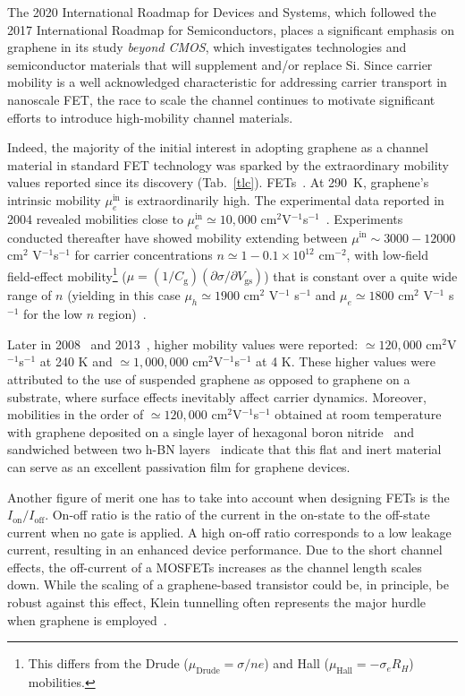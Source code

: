 The 2020 International Roadmap for Devices and Systems, which followed the 2017 International Roadmap for Semiconductors, places a significant emphasis on graphene in its study \textit{beyond CMOS}, which investigates technologies and semiconductor materials that will supplement and/or replace Si. Since carrier mobility is a well acknowledged characteristic for addressing carrier transport in nanoscale \gls{FET}, the race to scale the channel continues to motivate significant efforts to introduce high-mobility channel materials.

Indeed, the majority of the initial interest in adopting graphene as a channel material in standard FET technology was sparked by the extraordinary mobility values reported since its discovery (Tab.~\ref{tlc}). \glspl{FET}~\cite{schwierz2010nanometer}. At \SI{290}{\kelvin}, graphene's intrinsic mobility $\mu_e^{\textrm{in}}$ is extraordinarily high. The experimental data reported in 2004 revealed mobilities close to $\mu_e^\textrm{in}\simeq10,000$ cm$^{2}$V$^{-1}$s$^{-1}$~\cite{novoselov2004electric}.
Experiments conducted thereafter have showed mobility extending between $\mu^{\text{in}}\sim 3000 - 12000$ cm$^2$ V$^{-1}$s$^{-1}$ for carrier concentrations $n\simeq1 - 0.1 \times 10^{12}$ cm$^{-2}$, with
low-field field-effect mobility\footnote[2]{This differs from the Drude ($\mu_{\textrm{Drude}}=\sigma/ne$) and Hall ($\mu_\textrm{Hall}=-\sigma_e R_H$) mobilities.} ($\mu = (1/C_{\textrm{g}})(\partial \sigma/\partial V_{\textrm{gs}})$)
that is constant over a quite wide range of $n$ (yielding in this case $\mu_h\simeq1900$ cm$^2$ V$^{-1}$ s$^{-1}$ and $\mu_e\simeq1800$ cm$^2$ V$^{-1}$ s$^{-1}$ for the low $n$ region)~\cite{Meric2008}.




Later in 2008~\cite{bolotin2008ultrahigh} and 2013~\cite{wang2013one}, higher mobility values were reported: $\simeq120,000$ cm$^{2}$V$^{-1}$s$^{-1}$ at 240 K and $\simeq1,000,000$ cm$^{2}$V$^{-1}$s$^{-1}$ at 4 K. These higher values were attributed to the use of suspended graphene as opposed to graphene on a substrate, where surface effects inevitably affect carrier dynamics. Moreover, mobilities in the order of $\simeq120,000$ cm$^{2}$V$^{-1}$s$^{-1}$ obtained at room temperature with graphene deposited on a single layer of hexagonal boron nitride~\cite{dean2010boron} and sandwiched between two h-BN layers~\cite{wang2013one} indicate that this flat and inert material can serve as an excellent passivation film for graphene devices.

Another figure of merit one has to take into account when designing \glspl{FET} is the $I_\text{on}/I_\text{off}$. On-off ratio is the ratio of the current in the on-state to the off-state current when no gate is applied. A high on-off ratio corresponds to a low leakage current, resulting in an enhanced device performance. Due to the short channel effects, the off-current of a \glspl{MOSFET} increases as the channel length scales down. While the scaling of a graphene-based transistor could be, in principle, be robust against this effect, Klein tunnelling often represents the major hurdle when graphene is employed~\cite{schwierz2013graphene}.

